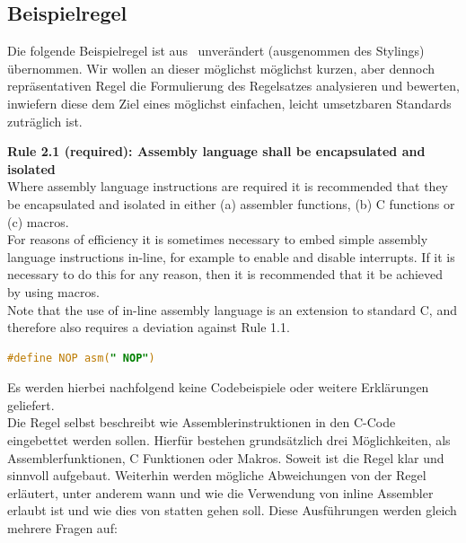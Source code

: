 \documentclass[a4paper,UKenglish,cleveref, autoref]{templates/lipics-v2019}
\begin{document}
    \subsection{Beispielregel}
    \label{subsec:beispielregel}

    Die folgende Beispielregel ist aus \misra\ unverändert (ausgenommen des Stylings) übernommen.
    Wir wollen an dieser möglichst möglichst kurzen, aber dennoch repräsentativen Regel die Formulierung des Regelsatzes
    analysieren und bewerten, inwiefern diese dem Ziel eines möglichst einfachen, leicht umsetzbaren Standards zuträglich ist.\\

    \noindent
    \begin{minipage}{\linewidth}
        \begin{example}
            \textbf{Rule 2.1 (required): Assembly language shall be encapsulated and isolated\cite{MISRA2004}}\\
            Where assembly language instructions are required it is recommended that they be encapsulated
            and isolated in either (a) assembler functions, (b) C functions or (c) macros.\\
            For reasons of efficiency it is sometimes necessary to embed simple assembly language instructions
            in-line, for example to enable and disable interrupts.
            If it is necessary to do this for any reason, then it is recommended that it be achieved by using macros.\\
            Note that the use of in-line assembly language is an extension to standard C, and therefore also
            requires a deviation against Rule 1.1.
            \begin{lstlisting}[language=C]
                #define NOP asm(" NOP")
            \end{lstlisting}
        \end{example}
    \end{minipage}
    Es werden hierbei nachfolgend keine Codebeispiele oder weitere Erklärungen geliefert.\\

    Die Regel selbst beschreibt wie Assemblerinstruktionen in den C-Code eingebettet werden sollen.
    Hierfür bestehen grundsätzlich drei Möglichkeiten, als Assemblerfunktionen, C Funktionen oder Makros.
    Soweit ist die Regel klar und sinnvoll aufgebaut.
    Weiterhin werden mögliche Abweichungen von der Regel erläutert, unter anderem wann und wie die Verwendung von inline
    Assembler erlaubt ist und wie dies von statten gehen soll.
    Diese Ausführungen werden gleich mehrere Fragen auf:
\end{document}
